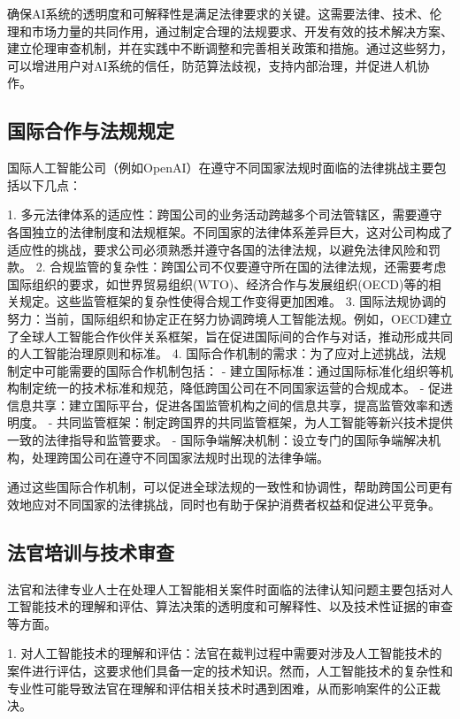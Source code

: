 确保AI系统的透明度和可解释性是满足法律要求的关键。这需要法律、技术、伦理和市场力量的共同作用，通过制定合理的法规要求、开发有效的技术解决方案、建立伦理审查机制，并在实践中不断调整和完善相关政策和措施。通过这些努力，可以增进用户对AI系统的信任，防范算法歧视，支持内部治理，并促进人机协作。

 
\subsection{国际合作与法规规定}

国际人工智能公司（例如OpenAI）在遵守不同国家法规时面临的法律挑战主要包括以下几点：

1. 多元法律体系的适应性：跨国公司的业务活动跨越多个司法管辖区，需要遵守各国独立的法律制度和法规框架。不同国家的法律体系差异巨大，这对公司构成了适应性的挑战，要求公司必须熟悉并遵守各国的法律法规，以避免法律风险和罚款。
2. 合规监管的复杂性：跨国公司不仅要遵守所在国的法律法规，还需要考虑国际组织的要求，如世界贸易组织(WTO)、经济合作与发展组织(OECD)等的相关规定。这些监管框架的复杂性使得合规工作变得更加困难。
3. 国际法规协调的努力：当前，国际组织和协定正在努力协调跨境人工智能法规。例如，OECD建立了全球人工智能合作伙伴关系框架，旨在促进国际间的合作与对话，推动形成共同的人工智能治理原则和标准。
4. 国际合作机制的需求：为了应对上述挑战，法规制定中可能需要的国际合作机制包括：
  - 建立国际标准：通过国际标准化组织等机构制定统一的技术标准和规范，降低跨国公司在不同国家运营的合规成本。
  - 促进信息共享：建立国际平台，促进各国监管机构之间的信息共享，提高监管效率和透明度。
  - 共同监管框架：制定跨国界的共同监管框架，为人工智能等新兴技术提供一致的法律指导和监管要求。
  - 国际争端解决机制：设立专门的国际争端解决机构，处理跨国公司在遵守不同国家法规时出现的法律争端。
 
通过这些国际合作机制，可以促进全球法规的一致性和协调性，帮助跨国公司更有效地应对不同国家的法律挑战，同时也有助于保护消费者权益和促进公平竞争。
 

\subsection{法官培训与技术审查}
法官和法律专业人士在处理人工智能相关案件时面临的法律认知问题主要包括对人工智能技术的理解和评估、算法决策的透明度和可解释性、以及技术性证据的审查等方面。

1. 对人工智能技术的理解和评估：法官在裁判过程中需要对涉及人工智能技术的案件进行评估，这要求他们具备一定的技术知识。然而，人工智能技术的复杂性和专业性可能导致法官在理解和评估相关技术时遇到困难，从而影响案件的公正裁决。

